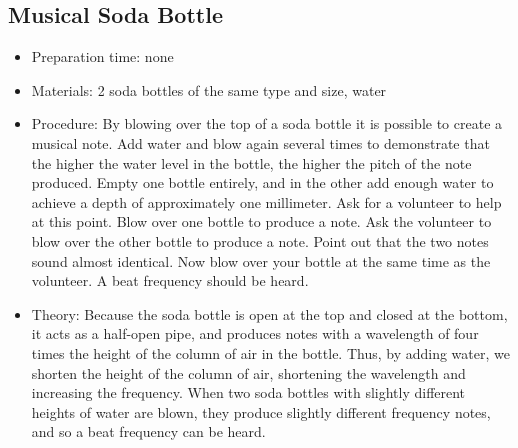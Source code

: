 \subsection{Musical Soda Bottle}
\begin{itemize}
\item{Preparation time: none}
\item{Materials: 2 soda bottles of the same type and size, water}
\item{Procedure: By blowing over the top of a soda bottle it is possible to create a musical note. Add water and blow again several times to demonstrate that the higher the water level in the bottle, the higher the pitch of the note produced. Empty one bottle entirely, and in the other add enough water to achieve a depth of approximately one millimeter. Ask for a volunteer to help at this point. Blow over one bottle to produce a note. Ask the volunteer to blow over the other bottle to produce a note. Point out that the two notes sound almost identical. Now blow over your bottle at the same time as the volunteer. A beat frequency should be heard.}
\item{Theory: Because the soda bottle is open at the top and closed at the bottom, it acts as a half-open pipe, and produces notes with a wavelength of four times the height of the column of air in the bottle. Thus, by adding water, we shorten the height of the column of air, shortening the wavelength and increasing the frequency. When two soda bottles with slightly different heights of water are blown, they produce slightly different frequency notes, and so a beat frequency can be heard.}
\end{itemize}

